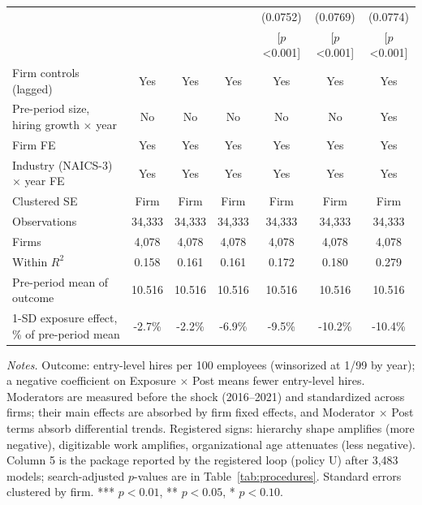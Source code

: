 \begin{table}[!htbp]
\begin{tabular*}{\linewidth}{@{\extracolsep{\fill}}lcccccc@{}}
 &  &  &  & (0.0752) & (0.0769) & (0.0774) \\
 &  &  &  & [$p$<0.001] & [$p$<0.001] & [$p$<0.001] \\
\midrule
Firm controls (lagged) & Yes & Yes & Yes & Yes & Yes & Yes \\
Pre-period size, hiring growth $\times$ year & No & No & No & No & No & Yes \\
Firm FE & Yes & Yes & Yes & Yes & Yes & Yes \\
Industry (NAICS-3) $\times$ year FE & Yes & Yes & Yes & Yes & Yes & Yes \\
Clustered SE & Firm & Firm & Firm & Firm & Firm & Firm \\
Observations & 34,333 & 34,333 & 34,333 & 34,333 & 34,333 & 34,333 \\
Firms & 4,078 & 4,078 & 4,078 & 4,078 & 4,078 & 4,078 \\
Within $R^2$ & 0.158 & 0.161 & 0.161 & 0.172 & 0.180 & 0.279 \\
Pre-period mean of outcome & 10.516 & 10.516 & 10.516 & 10.516 & 10.516 & 10.516 \\
1-SD exposure effect, \% of pre-period mean & -2.7\% & -2.2\% & -6.9\% & -9.5\% & -10.2\% & -10.4\% \\
\bottomrule
\end{tabular*}
\begin{minipage}{0.97\linewidth}\vspace{2pt}\scriptsize\textit{Notes.} Outcome: entry-level hires per 100 employees (winsorized at 1/99 by year); a negative coefficient on Exposure $\times$ Post means fewer entry-level hires. Moderators are measured before the shock (2016--2021) and standardized across firms; their main effects are absorbed by firm fixed effects, and Moderator $\times$ Post terms absorb differential trends. Registered signs: hierarchy shape amplifies (more negative), digitizable work amplifies, organizational age attenuates (less negative). Column 5 is the package reported by the registered loop (policy U) after 3,483 models; search-adjusted $p$-values are in Table~\ref{tab:procedures}. Standard errors clustered by firm. *** $p<0.01$, ** $p<0.05$, * $p<0.10$.\end{minipage}
\end{table}